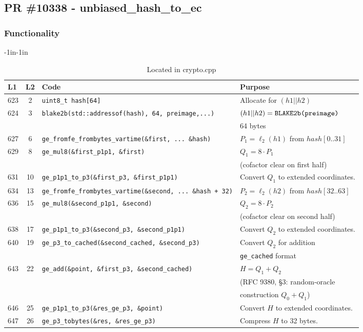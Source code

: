 \documentclass[12pt,titlepage,table]{article}
\begin{document}
\newpage

\subsection{PR \#10338 - unbiased\_hash\_to\_ec}
\subsubsection{Functionality}


\begin{table}[htbp]
\caption{unbiased\_hash\_to\_ec Source To Spec Map}
\begin{adjustwidth}{-1in}{-1in}
\centering
{
\begin{tabular}{| l | c | l | l |}
\hline
\textbf{L1} & \textbf{L2} & \textbf{Code} & \textbf{Purpose} \\
\hline
\hline
623 & 2 & \verb+uint8_t hash[64]+ & Allocate for $(h1 || h2)$ \\
624 & 3 & \verb+blake2b(std::addressof(hash), 64, preimage,...)+ & $(h1 || h2) = \verb+BLAKE2b(preimage)+$\\
&&&64 bytes \\
627 & 6 & \verb+ge_fromfe_frombytes_vartime(&first, ... &hash)+ & $P_1 = \ell_2(h1)$ from $hash[0..31]$\\
629 & 8 & \verb+ge_mul8(&first_p1p1, &first)+ & $Q_1 = 8 \cdot P_1$ \\ 
&&& (cofactor clear on first half)\\
631 & 10 & \verb+ge_p1p1_to_p3(&first_p3, &first_p1p1)+ & Convert $Q_1$ to extended coordinates.\\
634 & 13 & \verb|ge_fromfe_frombytes_vartime(&second, ... &hash + 32)| & $P_2 = \ell_2(h2)$ from $hash[32..63]$\\
636 & 15 & \verb+ge_mul8(&second_p1p1, &second)+ & $Q_2 = 8 \cdot P_2$ \\
&&& (cofactor clear on second half)\\
638 & 17 & \verb+ge_p1p1_to_p3(&second_p3, &second_p1p1)+ & Convert $Q_2$ to extended coordinates.\\
640 & 19 & \verb+ge_p3_to_cached(&second_cached, &second_p3)+ & Convert $Q_2$ for addition\\ 
&&& \verb+ge_cached+ format\\
643 & 22 & \verb+ge_add(&point, &first_p3, &second_cached)+ & $H = Q_1 + Q_2$ \\
&&&(RFC 9380, \S 3: random-oracle\\
&&&construction $Q_0 + Q_1$)\\
646 & 25 & \verb+ge_p1p1_to_p3(&res_ge_p3, &point)+ & Convert $H$ to extended coordinates. \\
647 & 26 & \verb+ge_p3_tobytes(&res, &res_ge_p3)+ & Compress $H$ to 32 bytes. \\
\hline
\end{tabular}}
\end{adjustwidth}
\caption*{Located in crypto.cpp}
\end{table}
\end{document}
